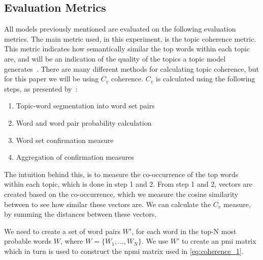\subsection{Evaluation Metrics}\label{sec:experiment_metrics}
All models previously mentioned are evaluated on the following evaluation metrics.
The main metric used, in this experiment, is the topic coherence metric.
This metric indicates how semantically similar the top words within each topic are, and will be an indication of the quality of the topics a topic model generates~\cite{topic_coherence_2015}.
There are many different methods for calculating topic coherence, but for this paper we will be using $C_v$ coherence.
$C_v$ is calculated using the following steps, as presented by~\citet{Syed2017coherence}:
\begin{enumerate}
	\item Topic-word segmentation into word set pairs
	\item Word and word pair probability calculation
	\item Word set confirmation measure
	\item Aggregation of confirmation measures
\end{enumerate}
The intuition behind this, is to measure the co-occurrence of the top words within each topic, which is done in step 1 and 2.
From step 1 and 2, vectors are created based on the co-occurrence, which we measure the cosine similarity between to see how similar these vectors are.
We can calculate the $C_v$ measure, by summing the distances between these vectors. 

We need to create a set of word pairs $W'$, for each word in the top-N most probable words $W$, where $W = \{W_1, \dots, W_N\}$.
We use $W'$ to create an \gls{pmi} matrix which in turn is used to construct the \acrshort{npmi} matrix used in \autoref{eq:coherence_1}.

